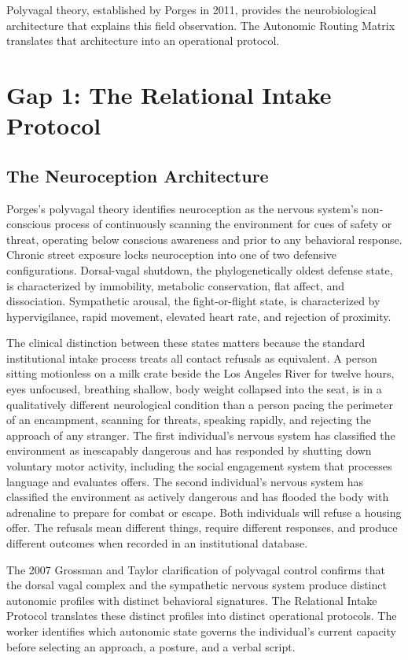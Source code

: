 \documentclass[12pt, letterpaper]{article}
\begin{document}
Polyvagal theory, established by Porges in 2011, provides the neurobiological architecture that explains this field observation. The Autonomic Routing Matrix translates that architecture into an operational protocol.


\clearpage
\section{Gap 1: The Relational Intake Protocol}

\subsection{The Neuroception Architecture}

Porges's polyvagal theory identifies neuroception as the nervous system's non-conscious process of continuously scanning the environment for cues of safety or threat, operating below conscious awareness and prior to any behavioral response. Chronic street exposure locks neuroception into one of two defensive configurations. Dorsal-vagal shutdown, the phylogenetically oldest defense state, is characterized by immobility, metabolic conservation, flat affect, and dissociation. Sympathetic arousal, the fight-or-flight state, is characterized by hypervigilance, rapid movement, elevated heart rate, and rejection of proximity.

The clinical distinction between these states matters because the standard institutional intake process treats all contact refusals as equivalent. A person sitting motionless on a milk crate beside the Los Angeles River for twelve hours, eyes unfocused, breathing shallow, body weight collapsed into the seat, is in a qualitatively different neurological condition than a person pacing the perimeter of an encampment, scanning for threats, speaking rapidly, and rejecting the approach of any stranger. The first individual's nervous system has classified the environment as inescapably dangerous and has responded by shutting down voluntary motor activity, including the social engagement system that processes language and evaluates offers. The second individual's nervous system has classified the environment as actively dangerous and has flooded the body with adrenaline to prepare for combat or escape. Both individuals will refuse a housing offer. The refusals mean different things, require different responses, and produce different outcomes when recorded in an institutional database.

The 2007 Grossman and Taylor clarification of polyvagal control confirms that the dorsal vagal complex and the sympathetic nervous system produce distinct autonomic profiles with distinct behavioral signatures. The Relational Intake Protocol translates these distinct profiles into distinct operational protocols. The worker identifies which autonomic state governs the individual's current capacity before selecting an approach, a posture, and a verbal script.
\end{document}
